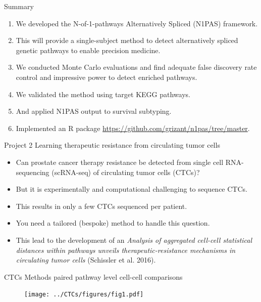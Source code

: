 \documentclass[ignorenonframetext,aspectratio=169,]{beamer}
\begin{document}
\begin{frame}{%
\protect\hypertarget{summary}{%
Summary}}

\begin{enumerate}
        \setlength\itemsep{1em}
  \item We developed the N-of-1-pathways Alternatively Spliced (N1PAS) framework.
    \item This will provide a single-subject method to detect alternatively spliced genetic pathways to enable precision medicine.
    \item We conducted Monte Carlo evaluations and find adequate false discovery rate control and impressive power to detect enriched pathways.
    \item We validated the method using target KEGG pathways.
    \item And applied N1PAS output to survival subtyping.
    \item Implemented an R package \url{https://github.com/grizant/n1pas/tree/master}.
  \end{enumerate}

\end{frame}

\begin{frame}{%
\protect\hypertarget{project-2-learning-therapeutic-resistance-from-circulating-tumor-cells}{%
Project 2 Learning therapeutic resistance from circulating tumor cells}}

\begin{itemize}
\item
  Can prostate cancer therapy resistance be detected from single cell
  RNA-sequencing (scRNA-seq) of circulating tumor cells (CTCs)?
\item
  But it is experimentally and computational challenging to sequence
  CTCs.
\item
  This results in only a few CTCs sequenced per patient.
\item
  You need a tailored (bespoke) method to handle this question.
\item
  This lead to the development of an \emph{Analysis of aggregated
  cell-cell statistical distances within pathways unveils
  therapeutic-resistance mechanisms in circulating tumor cells}
  (Schissler et al. 2016).
\end{itemize}

\end{frame}

\begin{frame}{%
\protect\hypertarget{ctcs-methods-paired-pathway-level-cell-cell-comparisons}{%
CTCs Methods paired pathway level cell-cell comparisons}}

\begin{figure}[htb]
  \centering \texttt{[image: ../CTCs/figures/fig1.pdf]}
\end{figure}

\end{frame}
\end{document}
